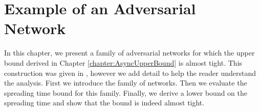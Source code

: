 \chapter{Example of an Adversarial Network}\label{chapter:asyncBoundTight}

In this chapter, we present a family of adversarial networks for which the upper bound derived in Chapter \ref{chapter:AsyncUpperBound} is almost tight. This construction was given in \cite{asyncPaper}, however we add detail to help the reader understand the analysis. First we introduce the family of networks. Then we evaluate the spreading time bound for this family. Finally, we derive a lower bound on the spreading time and show that the bound is indeed almost tight.




